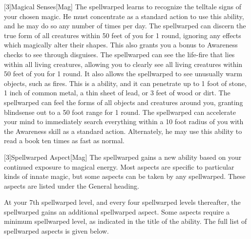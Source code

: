         [3]{Magical Senses}[Mag]
        The spellwarped learns to recognize the telltale signs of your chosen magic.
        He must concentrate as a standard action to use this ability, and he may do so any number of times per day.
        The spellwarped can discern the true form of all creatures within 50 feet of you for 1 round, ignoring any effects which magically alter their shapes.
        This also grants you a  bonus to Awareness checks to see through disguises.
        The spellwarped can see the life-fire that lies within all living creatures, allowing you to clearly see all living creatures within 50 feet of you for 1 round.
        It also allows the spellwarped to see unusually warm objects, such as fires.
        This is a  ability, and it can penetrate up to 1 foot of stone, 1 inch of common metal, a thin sheet of lead, or 3 feet of wood or dirt.
        The spellwarped can feel the forms of all objects and creatures around you, granting blindsense out to a 50 foot range for 1 round.
        The spellwarped can accelerate your mind to immediately search everything within a 10 foot radius of you with the Awareness skill as a standard action.
        Alternately, he may use this ability to read a book ten times as fast as normal.

        [3]{Spellwarped Aspect}[Mag]
        The spellwarped gains a new ability based on your continued exposure to magical energy.
        Most aspects are specific to particular kinds of innate magic, but some aspects can be taken by any spellwarped.
        These aspects are listed under the General heading.

        At your 7th spellwarped level, and every four spellwarped levels thereafter, the spellwarped gains an additional spellwarped aspect.
        Some aspects require a minimum spellwarped level, as indicated in the title of the ability.
        The full list of spellwarped aspects is given below.


